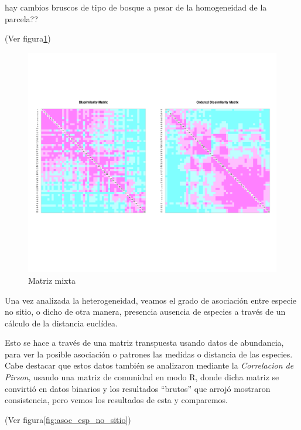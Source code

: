 \documentclass[11pt,]{article}
\begin{document}
hay cambios bruscos de tipo de bosque a pesar de la homogeneidad de la
parcela??

(Ver figura\ref{fig:punt_z})

\begin{figure}
\centering
\includegraphics{punt_z.png}
\caption{\label{fig:punt_z}Matriz mixta}
\end{figure}

Una vez analizada la heterogeneidad, veamos el grado de asociación entre
especie no sitio, o dicho de otra manera, presencia ausencia de especies
a través de un cálculo de la distancia euclídea.

Esto se hace a través de una matriz transpuesta usando datos de
abundancia, para ver la posible asociación o patrones las medidas o
distancia de las especies. Cabe destacar que estos datos también se
analizaron mediante la \emph{Correlacion de Pirson}, usando una matriz
de comunidad en modo R, donde dicha matriz se convirtió en datos
binarios y los resultados ``brutos'' que arrojó mostraron consistencia,
pero vemos los resultados de esta y comparemos.

(Ver figura\ref{fig:asoc_esp_no_sitio})
\end{document}
